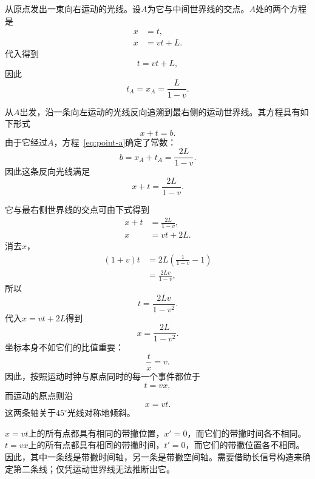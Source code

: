 从原点发出一束向右运动的光线。设\(A\)为它与中间世界线的交点。\(A\)处的两个方程是
\begin{align}
x&=t,\\
x&=vt+L.
\end{align}
代入得到
\begin{equation}
t=vt+L,
\end{equation}
因此
\begin{equation}
t_A=x_A=\frac{L}{1-v}.
\label{eq:point-a}
\end{equation}

从\(A\)出发，沿一条向左运动的光线反向追溯到最右侧的运动世界线。其方程具有如下形式
\begin{equation}
x+t=b.
\end{equation}
由于它经过\(A\)，方程~\eqref{eq:point-a}确定了常数：
\begin{equation}
b=x_A+t_A=\frac{2L}{1-v}.
\end{equation}
因此这条反向光线满足
\begin{equation}
x+t=\frac{2L}{1-v}.
\label{eq:backward-ray}
\end{equation}

它与最右侧世界线的交点可由下式得到
\begin{align}
x+t&=\frac{2L}{1-v},\\
x&=vt+2L.
\end{align}
消去\(x\)，
\begin{align}
(1+v)t
  &=2L\left(\frac{1}{1-v}-1\right)\\
  &=\frac{2Lv}{1-v},
\end{align}
所以
\begin{equation}
t=\frac{2Lv}{1-v^2}.
\end{equation}
代入\(x=vt+2L\)得到
\begin{equation}
x=\frac{2L}{1-v^2}.
\end{equation}
坐标本身不如它们的比值重要：
\begin{equation}
\frac{t}{x}=v.
\end{equation}
因此，按照运动时钟与原点同时的每一个事件都位于
\begin{equation}
t=vx,
\label{eq:simultaneity-c-one}
\end{equation}
而运动的原点则沿
\begin{equation}
x=vt.
\label{eq:moving-time-axis}
\end{equation}
这两条轴关于\(45^\circ\)光线对称地倾斜。

\(x=vt\)上的所有点都具有相同的带撇位置，\(x'=0\)，而它们的带撇时间各不相同。\(t=vx\)上的所有点都具有相同的带撇时间，\(t'=0\)，而它们的带撇位置各不相同。因此，其中一条线是带撇时间轴，另一条是带撇空间轴。需要借助长信号构造来确定第二条线；仅凭运动世界线无法推断出它。

